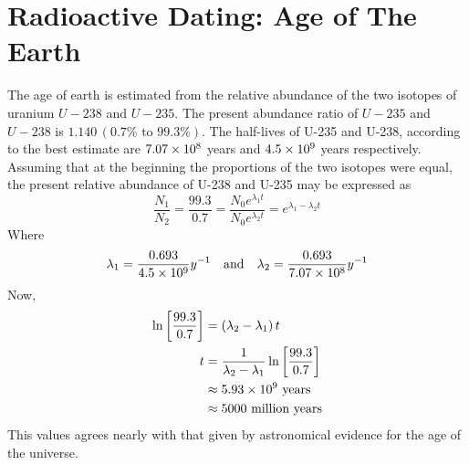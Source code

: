 \documentclass[../main.tex]{subfiles}
\begin{document}
\section{Radioactive Dating: Age of The Earth}
The age of earth is estimated from the relative abundance of the two isotopes of uranium $ U-238 $ and $ U-235 $. The present abundance ratio of $ U-235 $ and $ U-238 $ is $ 1.140 \,(0.7\% \text{ to } 99.3\%)$. The half-lives of U-235 and U-238, according to the best estimate are $ 7.07\times 10^{8} $ years and $ 4.5\times 10^{9} $ years respectively. Assuming that at the beginning the proportions of the two isotopes were equal, the present relative abundance of U-238 and U-235 may be expressed as
\[
    \frac{N_1}{N_2}=\frac{99.3}{0.7}=\frac{N_0e^{\lambda_1 t}}{N_0e^{\lambda_2 t}}=e^{\lambda_1 -\lambda_2 t}
\]
Where 
\[
    \lambda_1=\frac{0.693}{4.5\times 10^{9}}y^{-1}\quad\text{and}\quad\lambda_2=\frac{0.693}{7.07\times 10^{8}}y^{-1}
\]
Now, \begin{align*}
    \ln\left[ \frac{99.3}{0.7} \right]&=\left( \lambda_2-\lambda_1 \right)t\\
    t&=\frac{1}{\lambda_2-\lambda_1}\ln\left[ \frac{99.3}{0.7} \right]\\
    &\approx 5.93\times 10^{9} \text{ years}\\
    &\approx 5000 \text{ million years}
\end{align*}
This values agrees nearly with that given by astronomical evidence for the age of the universe.
\end{document}
